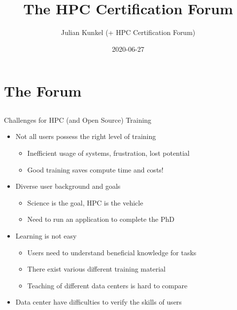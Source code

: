 \documentclass[compress,aspectratio=169]{beamer}
\subtitle{}
\title{\Large The HPC Certification Forum}
\author{Julian Kunkel (+ HPC Certification Forum)}
\date{2020-06-27}
\institute{Institute for Computer Science / GWDG}
\begin{document}
\begin{frame}[plain]{}
	\maketitle
\end{frame}



\section{The Forum}
\sectionIntroHidden

\subsection{}


\begin{frame}{Challenges for HPC (and Open Source) Training}
		\begin{itemize}
			\item Not all users possess the right level of training
				\begin{itemize}
				\item Inefficient usage of systems, frustration, lost potential
				\item Good training saves compute time and costs!
				\end{itemize}
      \item Diverse user background and goals
        \begin{itemize}
          \item Science is the goal, HPC is the vehicle
          \item Need to run an application to complete the PhD
        \end{itemize}
      \item Learning is not easy
			\begin{itemize}
				\item Users need to understand beneficial knowledge for tasks
				\item There exist various different training material
				\item Teaching of different data centers is hard to compare
			\end{itemize}
			\item Data center have difficulties to verify the skills of users
		\end{itemize}

\end{frame}
\end{document}

